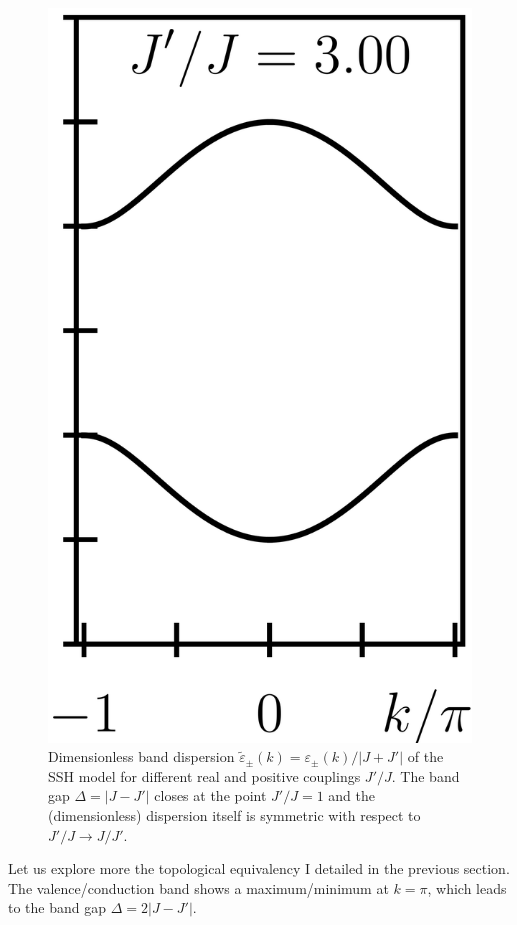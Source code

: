 \begin{figure}[ht]
    \includegraphics{figures/cropped_ssh_dispersion_3.png}
    \caption{Dimensionless band dispersion $\tilde\varepsilon_\pm(k)=\varepsilon_\pm(k)/|J+J'|$ of the SSH model for different real and positive couplings $J'/J$. The band gap $\Delta=|J-J'|$ closes at the point $J'/J=1$ and the (dimensionless) dispersion itself is symmetric with respect to $J'/J\rightarrow J/J'$.}
    \label{fig:ssh_dispersion}
\end{figure}
Let us explore more the topological equivalency I detailed in the previous section.
The valence/conduction band shows a maximum/minimum at $k=\pi$, which leads to the band gap $\Delta = 2\left|J-J'\right|$.
